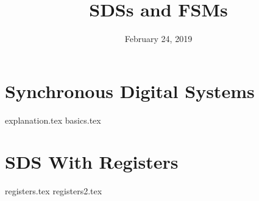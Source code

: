\documentclass[11pt]{exam}
\title{SDSs and FSMs}
\date{February 24, 2019}
\begin{document}
\maketitle

\section{Synchronous Digital Systems}
\begin{questions}
{explanation.tex}
{basics.tex}
\end{questions}
\newpage

\section{SDS With Registers}
\begin{questions}
{registers.tex}
{registers2.tex}
\end{questions}
\newpage
\end{document}
